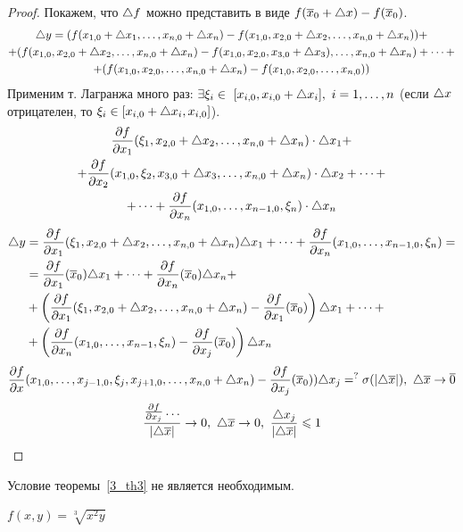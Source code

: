 \begin{proof}
	Покажем, что $\triangle f$ можно представить в виде $f(\overline x_0+\triangle x)-f(\overline x_0)$.
	\begin{multline*}
		\triangle y=(f(x_{1,0}+\triangle x_1,\dots,x_{n,0}+\triangle x_n)-f(x_{1,0},x_{2,0}+\triangle x_2,\dots,x_{n,0}+\triangle x_n))+\\
		+(f(x_{1,0},x_{2,0}+\triangle x_2,\dots,x_{n,0}+\triangle x_n)-f(x_{1,0},x_{2,0},x_{3,0}+\triangle x_3),\dots,x_{n,0}+\triangle x_n)+\dots+\\
		+(f(x_{1,0},x_{2,0},\dots,x_{n,0}+\triangle x_n)-f(x_{1,0},x_{2,0},\dots,x_{n,0}))
	\end{multline*}
	Применим т. Лагранжа много раз: $\ex\xi_i\in\ [x_{i,0},x_{i,0}+\tr x_i],\ i=1,\dots,n$ (если $\triangle x$ отрицателен, то $\xi_i\in[x_{i,0}+\triangle x_i,x_{i,0}]$).
	\begin{multline*}
		\frac{\partial f}{\partial x_1}(\xi_1,x_{2,0}+\triangle x_2,\dots,x_{n,0}+\triangle x_n)\cdot\triangle x_1+\\
		+\frac{\partial f}{\partial x_2}(x_{1,0},\xi_2,x_{3,0}+\triangle x_3,\dots,x_{n,0}+\triangle x_n)\cdot\triangle x_2+\dots+\\
		+\dots+\frac{\partial f}{\partial x_n}(x_{1,0},\dots,x_{n-1,0},\xi_n)\cdot\triangle x_n
	\end{multline*}
	\begin{equation*}
		\begin{split}
			\triangle y&=\frac{\partial f}{\partial x_1}(\xi_1,x_{2,0}+\triangle x_2,\dots,x_{n,0}+\triangle x_n)\triangle x_1+\dots+\frac{\partial f}{\partial x_n}(x_{1,0},\dots,x_{n-1,0},\xi_n)=\\
			&=\frac{\partial f}{\partial x_1}(\overline x_0)\triangle x_1+\dots+\frac{\partial f}{\partial x_n}(\overline x_0)\triangle x_n+\\
			&+\left(\frac{\partial f}{\partial x_1}(\xi_1,x_{2,0}+\triangle x_2,\dots,x_{n,0}+\triangle x_n)-\frac{\partial f}{\partial x_1}(\overline x_0)\right)\triangle x_1+\dots+\\
			&+\left(\frac{\partial f}{\partial x_n}(x_{1,0},\dots,x_{n-1},\xi_n)-\frac{\partial f}{\partial x_j}(\overline x_0)\right)\triangle x_n
		\end{split}
	\end{equation*}
	\[\frac{\partial f}{\partial x}(x_{1,0},\dots,x_{j-1,0},\xi_j,x_{j+1,0},\dots,x_{n,0}+\triangle x_n)-\frac{\partial f}{\partial x_j}(\overline x_0))\triangle x_j=^?\sigma(|\triangle\overline x|),\ \triangle\overline x\rightarrow\overline0\]
	\[\frac{\frac{\partial f}{\partial x_j}\dots}{|\triangle\overline x|}\rightarrow0,\ \triangle\overline x\rightarrow0,\ \frac{\triangle x_j}{|\triangle\overline x|}\leqslant1\]
\end{proof}
\begin{note}
	Условие теоремы{~\eqref{3_th3}} не является необходимым.
\end{note}
\begin{example}
	$f(x,y)=\sqrt[3]{x^2y}$
\end{example}